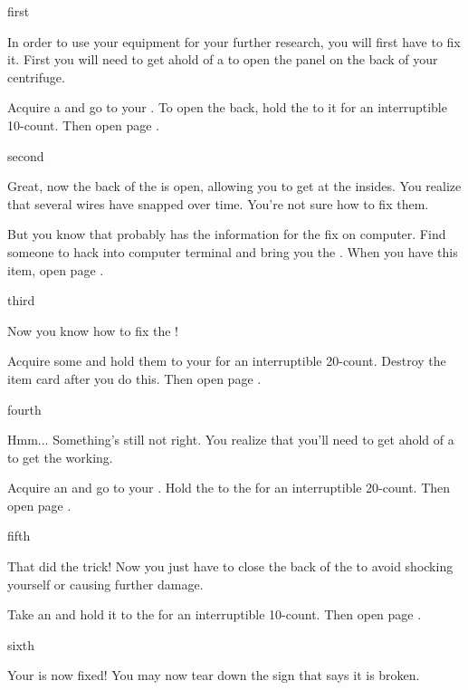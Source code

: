 \documentclass[greennotebook]{guildcamp4} %
\begin{document}
\startnotebook{\nJamesFixLab{}}

\begin{page}{first}

In order to use your equipment for your further research, you will first have to fix it. First you will need to get ahold of a \iWrench{} to open the panel on the back of your centrifuge.

Acquire a \iWrench{} and go to your \sCentrifugeBroken{}. To open the back, hold the \iWrench{} to it for an interruptible 10-count. Then open page .

\end{page}

\begin{page}{second}

Great, now the back of the \sCentrifugeBroken{} is open, allowing you to get at the insides. You realize that several wires have snapped over time. You're not sure how to fix them.

But you know that \cVthree{} probably has the information for the fix on \cVthree{\their} computer. Find someone to hack into \cVthree{\their} computer terminal and bring you the \iInformation{}. When you have this item, open page .

\end{page}

\begin{page}{third}

Now you know how to fix the \sCentrifugeBroken{}!

Acquire some \iWires{} and hold them to your \sCentrifugeBroken{} for an interruptible 20-count. Destroy the \iWires{} item card after you do this. Then open page .

\end{page}

\begin{page}{fourth}

Hmm... Something's still not right. You realize that you'll need to get ahold of a \iCalibrator{} to get the \sCentrifugeBroken{} working.

Acquire an \iCalibrator{} and go to your \sCentrifugeBroken{}. Hold the \iCalibrator{} to the \sCentrifugeBroken{} for an interruptible 20-count. Then open page .

\end{page}

\begin{page}{fifth}

That did the trick! Now you just have to close the back of the \sCentrifugeBroken{} to avoid shocking yourself or causing further damage.

Take an \iWrench{} and hold it to the \sCentrifugeBroken{} for an interruptible 10-count. Then open page .

\end{page}

\begin{page}{sixth}

Your \sCentrifuge{} is now fixed! You may now tear down the sign that says it is broken.

\end{page}

\endnotebook
\end{document}
